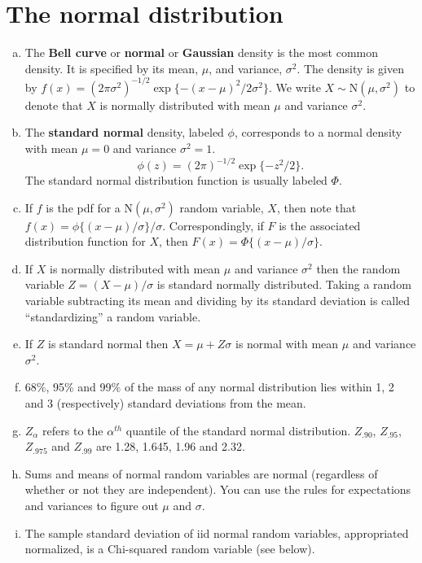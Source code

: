 \documentclass[12pt]{article}
\begin{document}
\section{The normal distribution}
\begin{enumerate}[a.]
\item The {\bf Bell curve} or {\bf normal} or {\bf Gaussian} density is the 
  most common density. It is specified by its mean, $\mu$, and variance, $\sigma^2$.
  The density is given by $f(x) = (2 \pi \sigma^2)^{-1/2}\exp\{-(x - \mu)^2 / 2 \sigma^2\}$.
  We write $X\sim \mathrm{N}(\mu, \sigma^2)$ to denote that $X$ is normally distributed
  with mean $\mu$ and variance $\sigma^2$.
\item The {\bf standard normal} density, labeled $\phi$, corresponds to a normal density
  with mean $\mu = 0$ and variance $\sigma^2 = 1$.
  $$
  \phi(z) = (2 \pi)^{-1/2}\exp\{-z^2 / 2\}.
  $$
  The standard normal distribution function is usually labeled $\Phi$.
\item If $f$ is the pdf for a $\mathrm{N}(\mu,\sigma^2)$ random variable, $X$,
  then note that $f(x) = \phi\{(x - \mu) / \sigma\} / \sigma$. 
  Correspondingly, if $F$ is the associated distribution
  function for $X$, then $F(x) = \Phi\{(x - \mu) / \sigma\}$.
\item If $X$ is normally distributed with mean $\mu$ and variance
  $\sigma^2$ then the random variable $Z = (X - \mu) / \sigma$ is standard normally
  distributed. Taking a random variable subtracting its mean and
  dividing by its standard deviation is called ``standardizing'' a
  random variable. 
\item If $Z$ is standard normal then $X = \mu + Z \sigma$ is normal with mean
  $\mu$ and variance $\sigma^2$.
\item 68\%, 95\% and 99\% of the mass of any normal distribution lies
  within 1, 2 and 3 (respectively) standard deviations from the mean.
\item $Z_\alpha$ refers to the $\alpha^{th}$ quantile of the standard normal
  distribution. $Z_{.90}$, $Z_{.95}$, $Z_{.975}$ and $Z_{.99}$ are
  1.28, 1.645, 1.96 and 2.32.
\item Sums and means of normal random variables are normal (regardless of whether or not
  they are independent). You can use the rules for expectations and variances to
  figure out $\mu$ and $\sigma$.
\item The sample standard deviation of iid normal random variables, appropriated
  normalized, is a Chi-squared random variable (see below).
\end{enumerate}
\end{document}
